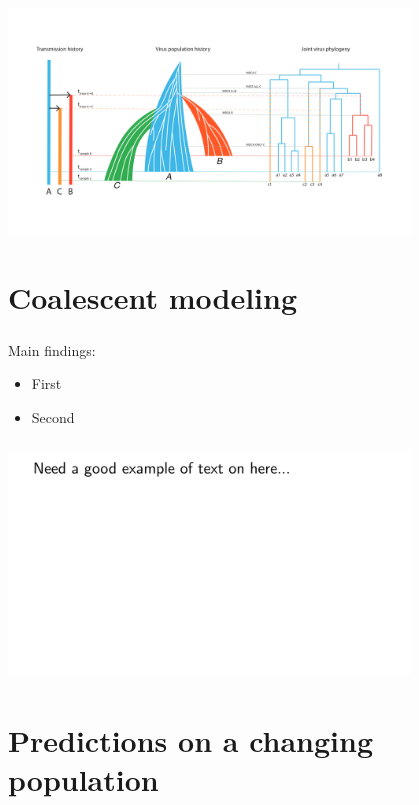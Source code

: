 \documentclass[aspectratio=169]{beamer}
\begin{document}
\begin{frame} \frametitle{\insertsection}
    \centering\includegraphics[width=0.8\textwidth]{images/thomas-figure}
\end{frame}

\section{Coalescent modeling}

\begin{frame} \frametitle{\insertsection}

    Main findings:
    \begin{itemize}
        \item First
        \item Second
    \end{itemize}

\end{frame}

\begin{frame} \frametitle{\insertsection}
    \centering\includegraphics[width=0.8\textwidth]{images/example}
\end{frame}

\section{Predictions on a changing population}
\end{document}
